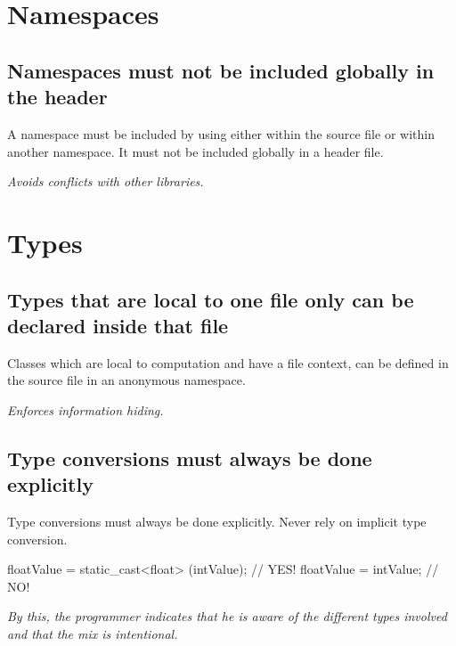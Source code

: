 \documentclass[a4paper,11pt,oneside]{scrbook}
\newcommand{\guideline}[1]{{\subsection{#1}}}
\newcommand{\motivation}[1]{{\normalfont \itshape #1}}
\newcommand{\trcode}[1]{{\normalfont \ttfamily #1}}
\begin{document}
\section{Namespaces}

\guideline{Namespaces must not be included globally in the header}

A namespace must be included by \trcode{using} either within the source file
or within another namespace. It must not be included globally in a header file.

\motivation{
  Avoids conflicts with other libraries.
}

\section{Types}

\guideline{Types that are local to one file only can be declared inside that file}

Classes which are local to computation and have a file context, can
be defined in the source file in an anonymous namespace.

\motivation{
  Enforces information hiding. 
}

\guideline{Type conversions must always be done explicitly}

Type conversions must always be done explicitly. Never rely on
implicit type conversion.

\begin{code}
  floatValue = static_cast<float> (intValue);   // YES! 
  floatValue = intValue;                        // NO! 
\end{code}

\motivation{
  By this, the programmer indicates that he is aware of the different
  types involved and that the mix is intentional.
}
\end{document}
